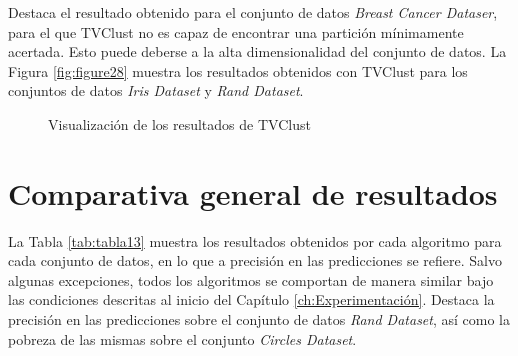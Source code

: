 Destaca el resultado obtenido para el conjunto de datos \textit{Breast Cancer Dataser}, para el que \acs{TVClust} no es capaz de encontrar una partición mínimamente acertada. Esto puede deberse a la alta dimensionalidad del conjunto de datos. La Figura \ref{fig:figure28} muestra los resultados obtenidos con \acs{TVClust} para los conjuntos de datos \textit{Iris Dataset} y \textit{Rand Dataset}. 


\begin{figure}[bth]
	\myfloatalign
	\caption{Visualización de los resultados de \acs{TVClust}}\label{fig:figure29}
\end{figure}

\clearpage

\section{Comparativa general de resultados}

La Tabla \ref{tab:tabla13} muestra los resultados obtenidos por cada algoritmo para cada conjunto de datos, en lo que a precisión en las predicciones se refiere. Salvo algunas excepciones, todos los algoritmos se comportan de manera similar bajo las condiciones descritas al inicio del Capítulo \ref{ch:Experimentación}. Destaca la precisión en las predicciones sobre el conjunto de datos \textit{Rand Dataset}, así como la pobreza de las mismas sobre el conjunto \textit{Circles Dataset}.

